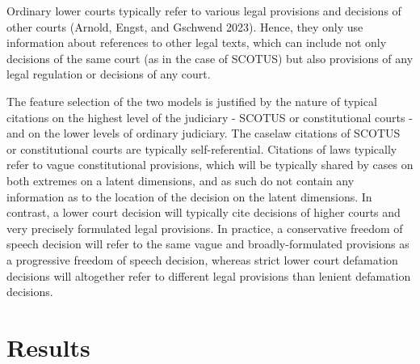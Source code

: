 \documentclass[
  11pt,
]{article}
\begin{document}
Ordinary lower courts typically refer to various legal provisions and
decisions of other courts (Arnold, Engst, and Gschwend 2023). Hence,
they only use information about references to other legal texts, which
can include not only decisions of the same court (as in the case of
SCOTUS) but also provisions of any legal regulation or decisions of any
court.

The feature selection of the two models is justified by the nature of
typical citations on the highest level of the judiciary - SCOTUS or
constitutional courts - and on the lower levels of ordinary judiciary.
The caselaw citations of SCOTUS or constitutional courts are typically
self-referential. Citations of laws typically refer to vague
constitutional provisions, which will be typically shared by cases on
both extremes on a latent dimensions, and as such do not contain any
information as to the location of the decision on the latent dimensions.
In contrast, a lower court decision will typically cite decisions of
higher courts and very precisely formulated legal provisions. In
practice, a conservative freedom of speech decision will refer to the
same vague and broadly-formulated provisions as a progressive freedom of
speech decision, whereas strict lower court defamation decisions will
altogether refer to different legal provisions than lenient defamation
decisions.

\hypertarget{results}{%
\section*{Results}\label{results}}
\end{document}
